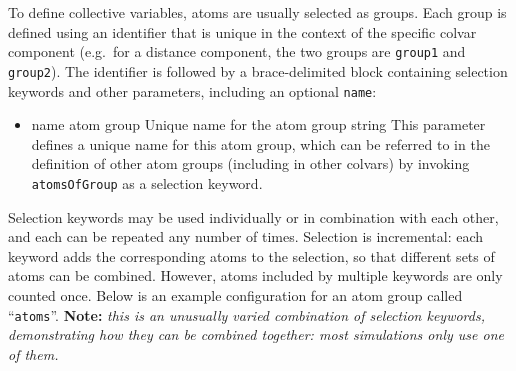 
To define collective variables, atoms are usually selected as groups.  Each group is defined using an identifier that is unique in the context of the specific colvar component (e.g.~for a distance component, the two groups are \texttt{group1} and \texttt{group2}).
The identifier is followed by a brace-delimited block containing selection keywords and other parameters, including an optional \texttt{name}:

\begin{itemize}
\item \key
  {name}{%
  atom group}{%
  Unique name for the atom group}{%
  string}{%
  This parameter defines a unique name for this atom group, which can be referred to
  in the definition of other atom groups (including in other colvars) by invoking
  \texttt{atomsOfGroup} as a selection keyword.}
\end{itemize}



Selection keywords may be used individually or in combination with each other, and each can be repeated any number of times.
Selection is incremental: each keyword adds the corresponding atoms to the selection, so that different sets of atoms can be combined.
However, atoms included by multiple keywords are only counted once.
Below is an example configuration for an atom group called ``\texttt{atoms}''.
\textbf{Note: }\emph{this is an unusually varied combination of selection keywords, demonstrating how they can be combined together: most simulations only use one of them.}\\

